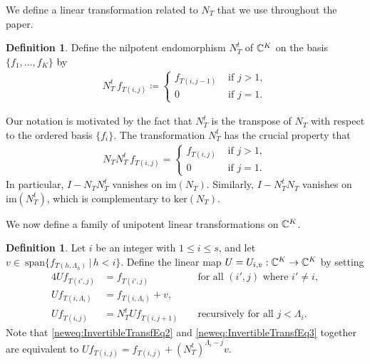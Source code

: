 \documentclass[11pt]{amsart}
\theoremstyle{definition}
\newtheorem{definition}[theorem]{Definition}
\newcommand{\st}{\,|\,}
\newcommand{\vspan}{\mathrm{span}}
\begin{document}
We define a linear transformation related to $N_T$ that we use throughout the paper.
\begin{definition}\label{def:NTranspose}
Define the nilpotent endomorphism $N^t_T$ of $\mathbb{C}^K$ on the basis $\{f_1,\dots, f_K\}$ by
\begin{align}
N^t_T \,f_{T(i,j)} \coloneqq \begin{cases} f_{T(i,j-1)} & \text{ if } j>1,\\ 0 & \text{ if }j = 1.\end{cases}
\end{align}
\end{definition}
Our notation is motivated by the fact that $N^t_T$ is the transpose of $N_T$ with respect to the ordered basis $\{f_i\}$. The transformation $N^t_T$ has the crucial property that 
\begin{align}\label{eq:NNTranspose}
N_TN^t_T \,f_{T(i,j)} = \begin{cases} f_{T(i,j)} &\text{ if } j > 1,\\ 0 &\text{ if } j = 1.\end{cases}
\end{align}
In particular, $I - N_TN_T^t$ vanishes on $\mathrm{im}(N_T)$. Similarly, $I - N_T^t N_T$ vanishes on $\mathrm{im}(N_T^t)$, which is complementary to $\mathrm{ker}(N_T)$.

We now define a family of unipotent linear transformations on $\mathbb{C}^K$.

\begin{definition}\label{newdef:InvertibleTransf}
Let $i$ be an integer with $1\leq i\leq s$, and let
$v\in\ \vspan\{f_{T(h,\Lambda_h)}\st h<i\}$. 
Define the linear map $U = U_{i,v}: \mathbb{C}^K\to \mathbb{C}^K$ by setting
\begin{alignat}{4}
    \label{neweq:InvertibleTransfEq1}
    U f_{T(i', j)} &= f_{T(i', j)} && \text{ for all }(i',j)\text{ where } i' \ne i, \\
    \label{neweq:InvertibleTransfEq2}
    U f_{T(i, \Lambda_i)} &= f_{T(i, \Lambda_i)} + v, \\
    \label{neweq:InvertibleTransfEq3}
    U f_{T(i, j)} &= N_T^t U f_{T(i, j+1)} && \text{ recursively for all } j < \Lambda_i.
\end{alignat}
Note that \eqref{neweq:InvertibleTransfEq2} and \eqref{neweq:InvertibleTransfEq3} together are equivalent to $U f_{T(i, j)} = f_{T(i, j)} + (N_T^t)^{\Lambda_i - j} v$.
\end{definition}
\end{document}
